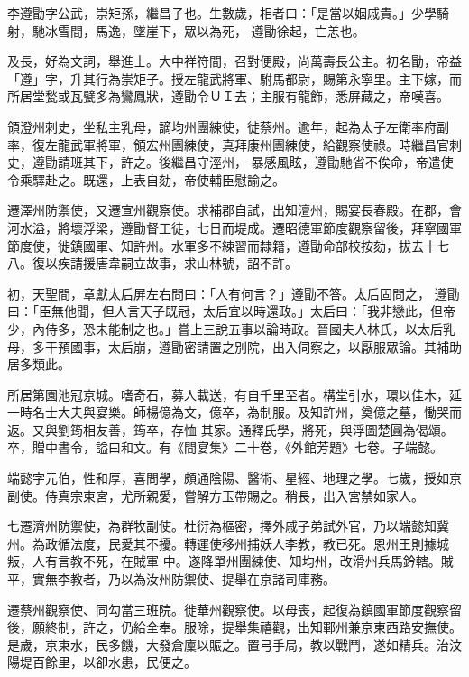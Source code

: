 \begin{pinyinscope}
 李遵勖字公武，崇矩孫，繼昌子也。生數歲，相者曰：「是當以姻戚貴。」少學騎射，馳冰雪間，馬逸，墜崖下，眾以為死，
 遵勖徐起，亡恙也。



 及長，好為文詞，舉進士。大中祥符間，召對便殿，尚萬壽長公主。初名勖，帝益「遵」字，升其行為崇矩子。授左龍武將軍、駙馬都尉，賜第永寧里。主下嫁，而所居堂甃或瓦甓多為鸞鳳狀，遵勖令ＵＩ去；主服有龍飾，悉屏藏之，帝嘆喜。



 領澄州刺史，坐私主乳母，謫均州團練使，徙蔡州。逾年，起為太子左衛率府副率，復左龍武軍將軍，領宏州團練使，真拜康州團練使，給觀察使祿。時繼昌官刺史，遵勖請班其下，許之。後繼昌守涇州，
 暴感風眩，遵勖馳省不俟命，帝遣使令乘驛赴之。既還，上表自劾，帝使輔臣慰諭之。



 遷澤州防禦使，又遷宣州觀察使。求補郡自試，出知澶州，賜宴長春殿。在郡，會河水溢，將壞浮梁，遵勖督工徒，七日而堤成。遷昭德軍節度觀察留後，拜寧國軍節度使，徙鎮國軍、知許州。水軍多不練習而隸籍，遵勖命部校按劾，拔去十七八。復以疾請援唐韋嗣立故事，求山林號，詔不許。



 初，天聖間，章獻太后屏左右問曰：「人有何言？」遵勖不答。太后固問之，
 遵勖曰：「臣無他聞，但人言天子既冠，太后宜以時還政。」太后曰：「我非戀此，但帝少，內侍多，恐未能制之也。」嘗上三說五事以論時政。晉國夫人林氏，以太后乳母，多干預國事，太后崩，遵勖密請置之別院，出入伺察之，以厭服眾論。其補助居多類此。



 所居第園池冠京城。嗜奇石，募人載送，有自千里至者。構堂引水，環以佳木，延一時名士大夫與宴樂。師楊億為文，億卒，為制服。及知許州，奠億之墓，慟哭而返。又與劉筠相友善，筠卒，存恤
 其家。通釋氏學，將死，與浮圖楚圓為偈頌。卒，贈中書令，謚曰和文。有《間宴集》二十卷，《外館芳題》七卷。子端懿。



 端懿字元伯，性和厚，喜問學，頗通陰陽、醫術、星經、地理之學。七歲，授如京副使。侍真宗東宮，尤所親愛，嘗解方玉帶賜之。稍長，出入宮禁如家人。



 七遷濟州防禦使，為群牧副使。杜衍為樞密，擇外戚子弟試外官，乃以端懿知冀州。為政循法度，民愛其不擾。轉運使移州捕妖人李教，教已死。恩州王則據城叛，人有言教不死，在賊軍
 中。遂降單州團練使、知均州，改滑州兵馬鈐轄。賊平，實無李教者，乃以為汝州防禦使、提舉在京諸司庫務。



 遷蔡州觀察使、同勾當三班院。徙華州觀察使。以母喪，起復為鎮國軍節度觀察留後，願終制，許之，仍給全奉。服除，提舉集禧觀，出知鄆州兼京東西路安撫使。是歲，京東水，民多饑，大發倉廩以賑之。置弓手局，教以戰鬥，遂如精兵。治汶陽堤百餘里，以卻水患，民便之。




\end{pinyinscope}

